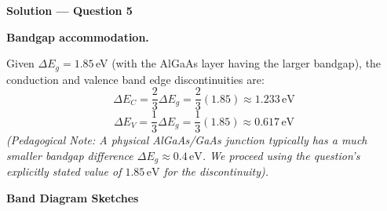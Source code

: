 \textbf{\large Solution --- Question 5}

\textbf{Bandgap accommodation.}

Given $\Delta E_g = 1.85$\,eV (with the AlGaAs layer having the larger bandgap), the conduction and valence band edge discontinuities are:
\begin{equation*}
  \Delta E_C = \frac{2}{3} \Delta E_g = \frac{2}{3}(1.85) \approx 1.233\,\text{eV}
\end{equation*}
\begin{equation*}
  \Delta E_V = \frac{1}{3} \Delta E_g = \frac{1}{3}(1.85) \approx 0.617\,\text{eV}
\end{equation*}
\textit{(Pedagogical Note: A physical AlGaAs/GaAs junction typically has a much smaller bandgap difference $\Delta E_g \approx 0.4\,\text{eV}$. We proceed using the question's explicitly stated value of $1.85\,\text{eV}$ for the discontinuity).}

\textbf{Band Diagram Sketches}

